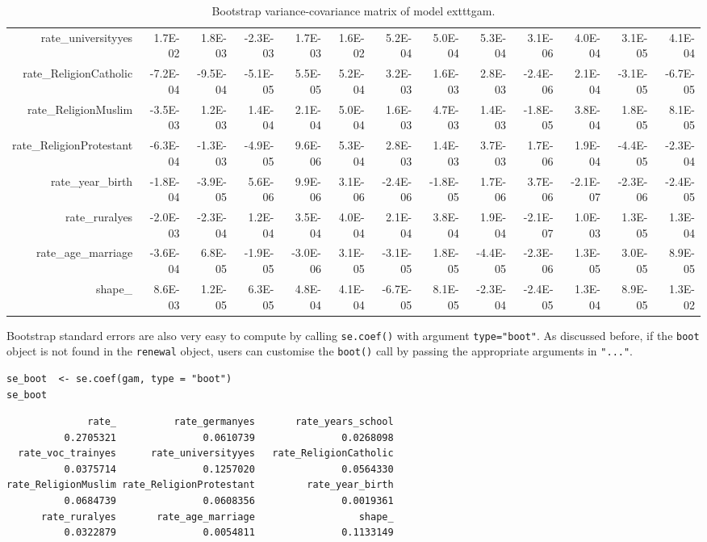 \documentclass[a4paper,twoside,11pt]{article}
\begin{document}
\begin{sidewaystable}[ht]
\begin{tabular}{rrrrrrrrrrrrr}
  rate\_universityyes & 1.7E-02 & 1.8E-03 & -2.3E-03 & 1.7E-03 & 1.6E-02 & 5.2E-04 & 5.0E-04 & 5.3E-04 & 3.1E-06 & 4.0E-04 & 3.1E-05 & 4.1E-04 \\ 
  rate\_ReligionCatholic & -7.2E-04 & -9.5E-04 & -5.1E-05 & 5.5E-05 & 5.2E-04 & 3.2E-03 & 1.6E-03 & 2.8E-03 & -2.4E-06 & 2.1E-04 & -3.1E-05 & -6.7E-05 \\ 
  rate\_ReligionMuslim & -3.5E-03 & 1.2E-03 & 1.4E-04 & 2.1E-04 & 5.0E-04 & 1.6E-03 & 4.7E-03 & 1.4E-03 & -1.8E-05 & 3.8E-04 & 1.8E-05 & 8.1E-05 \\ 
  rate\_ReligionProtestant & -6.3E-04 & -1.3E-03 & -4.9E-05 & 9.6E-06 & 5.3E-04 & 2.8E-03 & 1.4E-03 & 3.7E-03 & 1.7E-06 & 1.9E-04 & -4.4E-05 & -2.3E-04 \\ 
  rate\_year\_birth & -1.8E-04 & -3.9E-05 & 5.6E-06 & 9.9E-06 & 3.1E-06 & -2.4E-06 & -1.8E-05 & 1.7E-06 & 3.7E-06 & -2.1E-07 & -2.3E-06 & -2.4E-05 \\ 
  rate\_ruralyes & -2.0E-03 & -2.3E-04 & 1.2E-04 & 3.5E-04 & 4.0E-04 & 2.1E-04 & 3.8E-04 & 1.9E-04 & -2.1E-07 & 1.0E-03 & 1.3E-05 & 1.3E-04 \\ 
  rate\_age\_marriage & -3.6E-04 & 6.8E-05 & -1.9E-05 & -3.0E-06 & 3.1E-05 & -3.1E-05 & 1.8E-05 & -4.4E-05 & -2.3E-06 & 1.3E-05 & 3.0E-05 & 8.9E-05 \\ 
  shape\_ & 8.6E-03 & 1.2E-05 & 6.3E-05 & 4.8E-04 & 4.1E-04 & -6.7E-05 & 8.1E-05 & -2.3E-04 & -2.4E-05 & 1.3E-04 & 8.9E-05 & 1.3E-02 \\ 
   \hline
\end{tabular}
\caption{Bootstrap variance-covariance matrix of model 	exttt{gam}.} 
\label{tab:varCovar}
\end{sidewaystable}

Bootstrap standard errors are also very easy to compute by calling \texttt{se.coef()}
with argument \texttt{type="boot"}. As discussed before, if the \texttt{boot} object is not
found in the \texttt{renewal} object, users can customise the \texttt{boot()} call by
passing the appropriate arguments in \texttt{"..."}.
\begin{verbatim}
se_boot  <- se.coef(gam, type = "boot")
se_boot
\end{verbatim}

\begin{verbatim}
              rate_          rate_germanyes       rate_years_school 
          0.2705321               0.0610739               0.0268098 
  rate_voc_trainyes      rate_universityyes   rate_ReligionCatholic 
          0.0375714               0.1257020               0.0564330 
rate_ReligionMuslim rate_ReligionProtestant         rate_year_birth 
          0.0684739               0.0608356               0.0019361 
      rate_ruralyes       rate_age_marriage                  shape_ 
          0.0322879               0.0054811               0.1133149
\end{verbatim}
\end{document}
